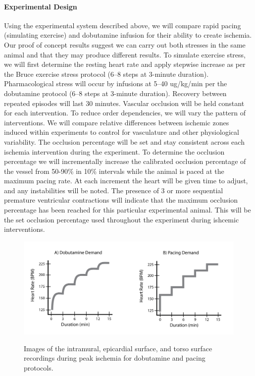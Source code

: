 \paragraph{Experimental Design} Using the experimental system described above, we will compare rapid pacing (simulating exercise) and dobutamine infusion for their ability to create ischemia. Our proof of concept results suggest we can carry out both stresses in the same animal and that they may produce different results.  To simulate exercise stress, we will first determine the resting heart rate and apply stepwise increase as per the Bruce exercise stress protocol (6--8 steps at 3-minute duration).\cite{BLZ:Oki1986} Pharmacological stress will occur by infusions at 5--40 ug/kg/min per the dobutamine protocol (6--8 steps at 3-minute duration).\cite{BLZ:SAL1992} Recovery between repeated episodes will last 30 minutes. Vascular occlusion will be held constant for each intervention. To reduce order dependencies, we will vary the pattern of interventions. We will compare relative differences between ischemic zones induced within experiments to control for vasculature and other physiological variability. The occlusion percentage will be set and stay consistent across each ischemia intervention during the experiment. To determine the occlusion percentage we will incrementally increase the calibrated occlusion percentage of the vessel from 50-90\% in 10\% intervals while the animal is paced at the maximum pacing rate. At each increment the heart will be given time to adjust, and any instabilities will be noted. The presence of 3 or more sequential premature ventricular contractions will indicate that the maximum occlusion percentage has been reached for this particular experimental animal. This will be the set occlusion percentage used throughout the experiment during ishcemic interventions. 

\begin{figure}[htb]%
	\begin{center}
		{\includegraphics[width=\textwidth]
			{../Figures/DobutvsPacingProtocol.png}}
		\captionsetup{width = \textwidth}
		\caption{\small \label{fig:dobutvspacing} Images of the
			intramural, epicardial surface, and torso surface recordings
			during peak ischemia for dobutamine and pacing protocols.}
	\end{center}
\end{figure}


